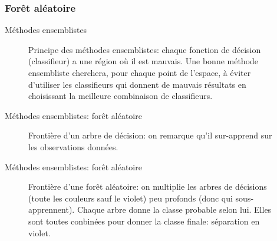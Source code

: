 \documentclass[8pt]{beamer}
\begin{document}
			\subsubsection{Forêt aléatoire}
				\begin{frame}{Méthodes ensemblistes}
					\begin{figure}[H]
						
						\caption*{Principe des méthodes ensemblistes: chaque fonction de décision (classifieur) a une région où il est mauvais. Une bonne méthode ensembliste cherchera, pour chaque point de l'espace, à éviter d'utiliser les classifieurs qui donnent de mauvais résultats en choisissant la meilleure combinaison de classifieurs.}
					\end{figure}
				\end{frame}
				\begin{frame}{Méthodes ensemblistes: forêt aléatoire}
					\begin{figure}[H]
						
						\caption*{Frontière d'un arbre de décision: on remarque qu'il sur-apprend sur les observations données.}
					\end{figure}
				\end{frame}
				\begin{frame}{Méthodes ensemblistes: forêt aléatoire}
					\begin{figure}[H]
						
						\caption*{Frontière d'une forêt aléatoire: on multiplie les arbres de décisions (toute les couleurs sauf le violet) peu profonds (donc qui sous-apprennent). Chaque arbre donne la classe probable selon lui. Elles sont toutes conbinées pour donner la classe finale: séparation en violet.}
					\end{figure}
				\end{frame}
\end{document}
